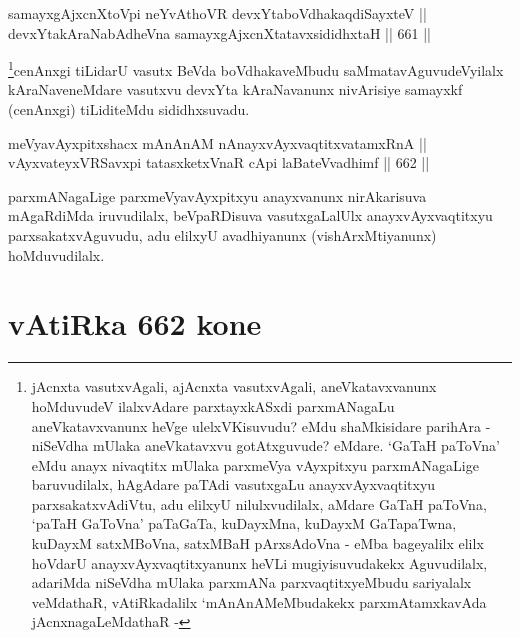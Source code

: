 
\begin{shl}
samayxgAjxcnXtoV\s pi neYvAthoVR devxYtaboVdhakaqdiSayxteV || \\
devxYtakAraNabAdheVna samayxgAjxcnXtatavxsididhxtaH \hfill || 661 ||  
\end{shl}

\begin{artha}
\footnote{jAcnxta vasutxvAgali, ajAcnxta vasutxvAgali,
aneVkatavxvanunx hoMduvudeV ilalxvAdare parxtayxkASxdi parxmANagaLu
aneVkatavxvanunx heVge ulelxVKisuvudu? eMdu shaMkisidare parihAra
- niSeVdha mUlaka aneVkatavxvu gotAtxguvude? eMdare. `GaTaH
paToVna' eMdu anayx nivaqtitx mUlaka parxmeVya vAyxpitxyu
parxmANagaLige baruvudilalx, hAgAdare paTAdi vasutxgaLu
anayxvAyxvaqtitxyu parxsakatxvAdiVtu, adu elilxyU nilulxvudilalx,
aMdare GaTaH paToVna, `paTaH GaToVna' paTaGaTa, kuDayxMna, kuDayxM
GaTapaTwna, kuDayxM satxMBoVna, satxMBaH pArxsAdoVna - eMba
bageyalilx elilx hoVdarU anayxvAyxvaqtitxyanunx heVLi
mugiyisuvudakekx Aguvudilalx, adariMda niSeVdha mUlaka parxmANa
parxvaqtitxyeMbudu sariyalalx veMdathaR, vAtiRkadalilx
`mAnAnAMeMbudakekx parxmAtamxkavAda jAcnxnagaLeMdathaR -}cenAnxgi tiLidarU vasutx BeVda boVdhakaveMbudu saMmatavAguvudeVyilalx kAraNaveneMdare vasutxvu devxYta kAraNavanunx nivArisiye samayxkf (cenAnxgi) tiLiditeMdu sididhxsuvadu.
\end{artha}

\begin{shl}
meVyavAyxpitxshacx mAnAnAM nAnayxvAyxvaqtitxvatamxRnA || \\
vAyxvateyxVRSavxpi tatasxketxVnaR cApi laBateV\s vadhimf  \hfill || 662 ||  
\end{shl}

\begin{artha}
parxmANagaLige parxmeVyavAyxpitxyu anayxvanunx nirAkarisuva mAgaRdiMda iruvudilalx, beVpaRDisuva vasutxgaLalUlx anayxvAyxvaqtitxyu parxsakatxvAguvudu, adu elilxyU avadhiyanunx (vishArxMtiyanunx) hoMduvudilalx.
\end{artha}

\section*{vAtiRka 662 kone}




